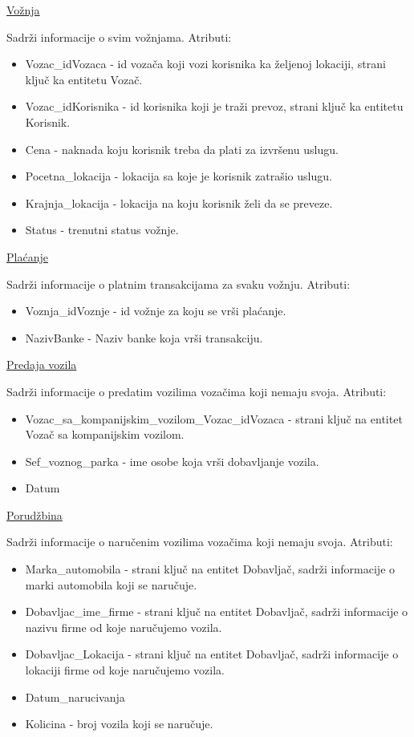 \begin{flushleft}
\underline{Vožnja}
\end{flushleft}
Sadrži informacije o svim vožnjama. Atributi:
\begin{itemize}
    \item Vozac\_idVozaca - id vozača koji vozi korisnika ka željenoj lokaciji, strani ključ ka entitetu Vozač.
    \item Vozac\_idKorisnika - id korisnika koji je traži prevoz, strani ključ ka entitetu Korisnik.
    \item Cena - naknada koju korisnik treba da plati za izvršenu uslugu.
    \item Pocetna\_lokacija - lokacija sa koje je korisnik zatrašio uslugu.
    \item Krajnja\_lokacija - lokacija na koju korisnik želi da se preveze.
    \item Status - trenutni status vožnje.
\end{itemize}

\begin{flushleft}
\underline{Plaćanje}
\end{flushleft}
Sadrži informacije o platnim transakcijama za svaku vožnju. Atributi:
\begin{itemize}
    \item Voznja\_idVoznje - id vožnje za koju se vrši plaćanje.
    \item NazivBanke - Naziv banke koja vrši transakciju.
\end{itemize}

\begin{flushleft}
\underline{Predaja vozila}
\end{flushleft}
Sadrži informacije o predatim vozilima vozačima koji nemaju svoja. Atributi:
\begin{itemize}
    \item Vozac\_sa\_kompanijskim\_vozilom\_Vozac\_idVozaca - strani ključ na entitet Vozač sa kompanijskim vozilom.
    \item Sef\_voznog\_parka - ime osobe koja vrši dobavljanje vozila.
    \item Datum
\end{itemize}

\begin{flushleft}
\underline{Porudžbina}
\end{flushleft}
Sadrži informacije o naručenim vozilima vozačima koji nemaju svoja. Atributi:
\begin{itemize}
    \item Marka\_automobila - strani ključ na entitet Dobavljač, sadrži informacije o marki automobila koji se naručuje.
    \item Dobavljac\_ime\_firme - strani ključ na entitet Dobavljač, sadrži informacije o nazivu firme od koje naručujemo vozila.
    \item Dobavljac\_Lokacija - strani ključ na entitet Dobavljač, sadrži informacije o lokaciji firme od koje naručujemo vozila.
    \item Datum\_narucivanja
    \item Kolicina - broj vozila koji se naručuje.
\end{itemize}
